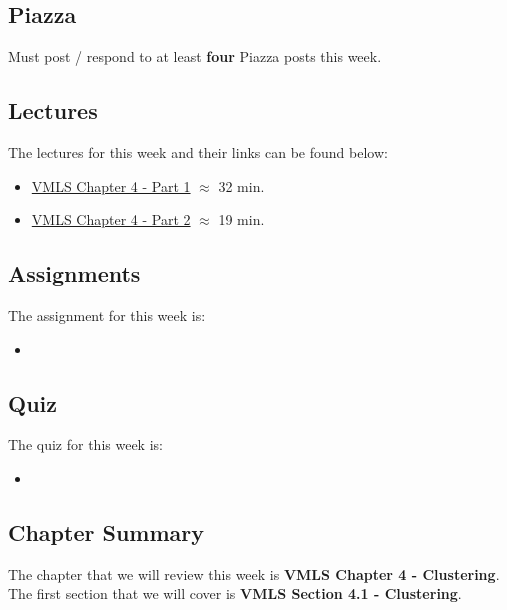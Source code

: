 \subsection{Piazza}

Must post / respond to at least \textbf{four} Piazza posts this week.

\subsection{Lectures}

The lectures for this week and their links can be found below:

\begin{itemize}
    \item \href{https://www.youtube.com/watch?v=liaZ_SCuE1w&list=PLoROMvodv4rMz-WbFQtNUsUElIh2cPmN9&index=14}{VMLS Chapter 4 - Part 1} $\approx$ 32 min.
    \item \href{https://www.youtube.com/watch?v=a4GjONqojzM&list=PLoROMvodv4rMz-WbFQtNUsUElIh2cPmN9&index=15}{VMLS Chapter 4 - Part 2} $\approx$ 19 min.
\end{itemize}

\subsection{Assignments}

The assignment for this week is:

\begin{itemize}
    \item {}
\end{itemize}

\subsection{Quiz}

The quiz for this week is:

\begin{itemize}
    \item {}
\end{itemize}

\subsection{Chapter Summary}

The chapter that we will review this week is \textbf{VMLS Chapter 4 - Clustering}. The first section that we will cover is \textbf{VMLS Section 4.1 - Clustering}.

